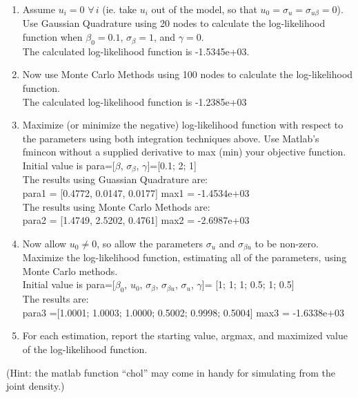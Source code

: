 \documentclass[10pt]{article}
\begin{document}
\begin{enumerate}
	\item Assume $u_i=0\,\,\forall\,i$ (ie. take $u_i$ out of the model, so that $u_0=\sigma_u=\sigma_{u\beta}=0$). Use Gaussian Quadrature using 20 nodes to calculate the log-likelihood function when $\beta_0=0.1$, $\sigma_{\beta}=1$, and $\gamma=0$. \\[1em]
	The calculated log-likelihood function is  -1.5345e+03. \\[1em]
	\item Now use Monte Carlo Methods using 100 nodes to calculate the log-likelihood function. \\[1em]
     The calculated log-likelihood function is  -1.2385e+03 \\[1em]
	\item Maximize (or minimize the negative) log-likelihood function with respect to the parameters using both integration techniques above. Use Matlab's fmincon without a supplied derivative to max (min) your objective function.  \\[1em]
	Initial value is para=[$\beta$, $\sigma_\beta$, $\gamma$]=[0.1; 2; 1] \\
	The results using Guassian Quadrature are:\\
	para1 = [0.4772, 0.0147, 0.0177]      max1 = -1.4534e+03 \\
	The results using Monte Carlo Methods are:\\
    para2 = [1.4749, 2.5202, 0.4761]     max2 = -2.6987e+03  \\[1em]
	\item Now allow $u_0\ne0$, so allow the parameters $\sigma_u$ and $\sigma_{\beta u}$ to be non-zero. Maximize the log-likelihood function, estimating all of the parameters, using Monte Carlo methods.\\[1em]
	Initial value is para=[$\beta_0$, $u_0$, $\sigma_\beta$, $\sigma_{\beta u}$, $\sigma_u$, $\gamma$]= [1; 1; 1; 0.5; 1; 0.5] \\
	The results are: \\
	para3 =[1.0001; 1.0003; 1.0000; 0.5002; 0.9998; 0.5004] max3 = -1.6338e+03 \\[1em]
	\item For each estimation, report the starting value, argmax, and maximized value of the log-likelihood function.
\end{enumerate}

\vspace{2em}
(Hint: the matlab function ``chol'' may come in handy for simulating from the joint density.) 
\end{document}
